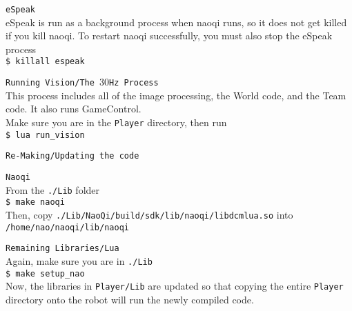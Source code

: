 \documentclass{article}
\begin{document}
\begin{description}
\begin{description}
      \item \texttt{eSpeak} \\
      eSpeak is run as a background process when naoqi runs, so it does not get killed if you kill naoqi.  To restart naoqi successfully, you must also stop the eSpeak process\\
      \texttt{\$ killall espeak}
    \end{description}

    \item \texttt{Running Vision/The $30$Hz Process}\\
    This process includes all of the image processing, the World code, and the Team code.  It also runs GameControl.\\
    Make sure you are in the \texttt{Player} directory, then run\\
    \texttt{\$ lua run\_vision}

    \item \texttt{Re-Making/Updating the code}
    \begin{description}

      \item \texttt{Naoqi}\\
      From the \texttt{./Lib} folder\\
      \texttt{\$ make naoqi}\\
      Then, copy \texttt{./Lib/NaoQi/build/sdk/lib/naoqi/libdcmlua.so} into \texttt{/home/nao/naoqi/lib/naoqi}

      \item \texttt{Remaining Libraries/Lua}\\
      Again, make sure you are in \texttt{./Lib}\\
      \texttt{\$ make setup\_nao}\\
      Now, the libraries in \texttt{Player/Lib} are updated so that copying the entire \texttt{Player} directory onto the robot will run the newly compiled code. 


    \end{description}

  \end{description}
\end{document}
